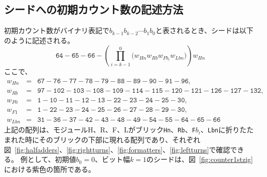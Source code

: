 \documentclass[a4,11pt]{article}
\begin{document}
\subsection{シードへの初期カウント数の記述方法}
初期カウント数がバイナリ表記で$b_{k-1}b_{k-2} \cdots b_1b_0$と表されるとき、シードは以下のように記述される。
\begin{equation} \label{eq:zagencoding}
\texttt{64}{-}\texttt{65}{-}\texttt{66}{-}\left( \prod^0_{i = k-1} \bigl(  w_{Hn} w_{Rb} w_{Fb_i} w_{Lbn} \bigr) \right) w_{Hn}
\end{equation}
ここで、
\begin{eqnarray*}
w_{Hn} &=& \texttt{67}{-}\texttt{76}{-}\texttt{77}{-}\texttt{78}{-}\texttt{79}{-}\texttt{88}{-}\texttt{89}{-}\texttt{90}{-}\texttt{91}{-}\texttt{96},\\
w_{Rb} &=& \texttt{97}{-}\texttt{102}{-}\texttt{103}{-}\texttt{108}{-}\texttt{109}{-}\texttt{114}{-}\texttt{115}{-}\texttt{120}{-}\texttt{121}{-}\texttt{126}{-}\texttt{127}{-}\texttt{132},\\
w_{F0} &=& \texttt{1}{-}\texttt{10}{-}\texttt{11}{-}\texttt{12}{-}\texttt{13}{-}\texttt{22}{-}\texttt{23}{-}\texttt{24}{-}\texttt{25}{-}\texttt{30},\\
w_{F1} &=& \texttt{1}{-}\texttt{22}{-}\texttt{23}{-}\texttt{24}{-}\texttt{25}{-}\texttt{26}{-}\texttt{27}{-}\texttt{28}{-}\texttt{29}{-}\texttt{30},\\
 w_{Lbn} &=& \texttt{31}{-}\texttt{36}{-}\texttt{37}{-}\texttt{42}{-}\texttt{43}{-}\texttt{48}{-}\texttt{49}{-}\texttt{54}{-}\texttt{55}{-}\texttt{64}{-}\texttt{65}{-}\texttt{66}
\end{eqnarray*}
上記の配列は、モジュールH、R、F、Lがブリック\texttt{Hn}、\texttt{Rb}、\texttt{F}$b_i$、\texttt{Lbn}に折りたたまれた時にそのブリックの下部に現れる配列であり、それぞれ図~\ref{fig:halfadders}、\ref{fig:rightturns}、\ref{fig:formatters}、\ref{fig:leftturns}で確認できる。
例として、初期値$b_0 = 0$、ビット幅$k = 1$のシードは、図~\ref{fig:counter1stzig}における紫色の箇所である。

%
%
\newpage
%
\end{document}
